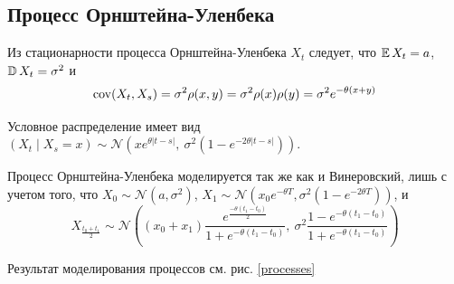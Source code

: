 \subsection{Процесс Орнштейна-Уленбека}

    Из стационарности процесса Орнштейна-Уленбека $X_t$ следует, что 
    $\operatorname{\mathbb{E}} X_t = a$, $\operatorname{\mathbb{D}} X_t = \sigma^2$ и
    \begin{equation*}
        \operatorname{cov} (X_t,X_s) = \sigma^2 \rho(x,y) = \sigma^2 \rho(x) \rho(y) = 
        \sigma^2 e^{-\theta(x+y)}
    \end{equation*}

    Условное распределение имеет вид $(X_t \mid X_s = x) \sim 
    \mathcal{N}(x e^{\theta |t-s|},\:\sigma^2(1-e^{-2\theta |t-s|}))$.

    Процесс Орнштейна-Уленбека моделируется так же как и Винеровский, лишь с 
    учетом того, что $X_0 \sim \mathcal{N}(a,\sigma^2)$, 
    $X_1 \sim \mathcal{N}(x_0 e^{-\theta T}, \sigma^2 (1-e^{-2\theta T}))$, и
    \begin{equation*}
        X_{\frac{t_0 + t_1}{2}} \sim \mathcal{N}\left( 
            (x_0+x_1)\frac{e^\frac{-\theta(t_1-t_0)}{2}}{1 + e^{-\theta(t_1-t_0)}},\:
            \sigma^2 \frac{1 - e^{-\theta(t_1-t_0)}}{1 + e^{-\theta(t_1-t_0)}} 
            \right)
    \end{equation*}

    Результат моделирования процессов см. рис. \ref{processes}

